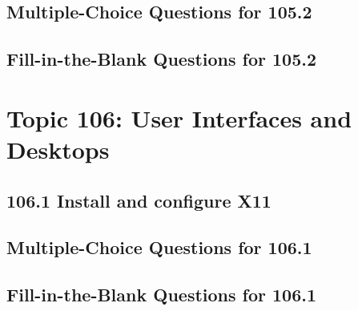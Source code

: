 \documentclass[a4paper]{report}
\begin{document}
\newpage
\section*{Multiple-Choice Questions for 105.2}

\newpage
\section*{Fill-in-the-Blank Questions for 105.2}


\newpage
\chapter{Topic 106: User Interfaces and Desktops}


\newpage
\section*{106.1 Install and configure X11}

\newpage
\section*{Multiple-Choice Questions for 106.1}

\newpage
\section*{Fill-in-the-Blank Questions for 106.1}

\newpage
\end{document}
